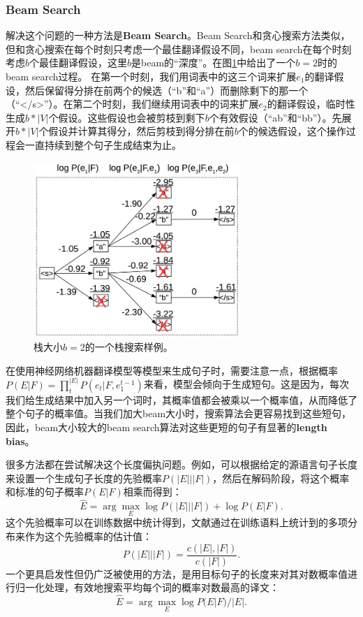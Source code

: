 \documentclass[10pt,a4paper]{ctexart}
\begin{document}
\subsubsection{Beam Search}
解决这个问题的一种方法是\textbf{Beam Search}。Beam Search和贪心搜索方法类似，但和贪心搜索在每个时刻只考虑一个最佳翻译假设不同，beam search在每个时刻考虑$b$个最佳翻译假设，这里$b$是beam的“深度”。在图\ref{fig:23}中给出了一个$b=2$时的beam search过程。
在第一个时刻，我们用词表中的这三个词来扩展$e_1$的翻译假设，然后保留得分排在前两个的候选（“b”和“a”）而删除剩下的那一个（“</s>”）。在第二个时刻，我们继续用词表中的词来扩展$e_2$的翻译假设，临时性生成$b * |V|$个假设。这些假设也会被剪枝到剩下$b$个有效假设（“ab”和“bb”）。先展开$b * |V|$个假设并计算其得分，然后剪枝到得分排在前$b$个的候选假设，这个操作过程会一直持续到整个句子生成结束为止。

\begin{figure}[H]
\centering
\includegraphics[width=0.7\textwidth]{fig23.png}
\caption{栈大小$b=2$的一个栈搜索样例。}
\label{fig:23}
\end{figure}

在使用神经网络机器翻译模型等模型来生成句子时，需要注意一点，根据概率$P(E|F) = \prod_t^{|E|}P(e_t | F,e_1^{t-1})$来看，模型会倾向于生成短句。这是因为，每次我们给生成结果中加入另一个词时，其概率值都会被乘以一个概率值，从而降低了整个句子的概率值。当我们加大beam大小时，搜索算法会更容易找到这些短句，因此，beam大小较大的beam search算法对这些更短的句子有显著的\textbf{length bias}。

很多方法都在尝试解决这个长度偏执问题。例如，可以根据给定的源语言句子长度来设置一个生成句子长度的先验概率$P(|E| | |F|)$，然后在解码阶段，将这个概率和标准的句子概率$P(E | F)$相乘而得到\cite{eriguchi2016tree}：
\[
 \hat{E} = \arg \max \limits_{E} \log P(|E|||F|) + \log P(E|F).
\]
这个先验概率可以在训练数据中统计得到，文献\cite{eriguchi2016tree}通过在训练语料上统计到的多项分布来作为这个先验概率的估计值：
\[
 P(|E|||F|) = \frac{c(|E|,|F|)}{c(|F|)}.
\]
一个更具启发性但仍广泛被使用的方法，是用目标句子的长度来对其对数概率值进行归一化处理，有效地搜索平均每个词的概率对数最高的译文\cite{cho2014properties}：
\[
 \hat{E} = \arg \max \limits_{E} \log P(E|F)/|E|.
\]
\end{document}
